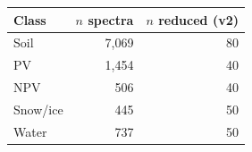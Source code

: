 \begin{tabular}{l r r}
\toprule
Class & $n$ spectra & $n$ reduced (v2) \\
\midrule
Soil & 7{,}069 & 80 \\
PV & 1{,}454 & 40 \\
NPV & 506 & 40 \\
Snow/ice & 445 & 50 \\
Water & 737 & 50 \\
\bottomrule
\end{tabular}
